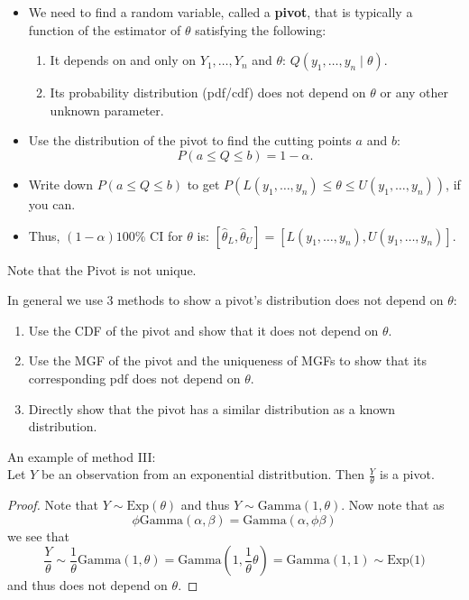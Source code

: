 \documentclass[a4paper,12pt]{article}
\theoremstyle{nonitalic}
\begin{document}
    \begin{itemize}
        \item We need to find a random variable, called a \textbf{pivot}, that is typically a function of the estimator of \(\theta\) satisfying the following:
        \begin{enumerate}
            \item It depends on and only on \(Y_1, \ldots, Y_n\) and \(\theta\): \(Q(y_1, \ldots, y_n \mid \theta)\).
            \item Its probability distribution (pdf/cdf) does not depend on \(\theta\) or any other unknown parameter.
        \end{enumerate}
        \item Use the distribution of the pivot to find the cutting points \(a\) and \(b\):
        \[
        P(a \leq Q \leq b) = 1 - \alpha.
        \]
        \item Write down \(P(a \leq Q \leq b)\) to get \(P(L(y_1, \ldots, y_n) \leq \theta \leq U(y_1, \ldots, y_n))\), if you can.
        \item Thus, \((1-\alpha)100\%\) CI for \(\theta\) is: \([\hat{\theta}_L, \hat{\theta}_U] = [L(y_1, \ldots, y_n), U(y_1, \ldots, y_n)]\).
    \end{itemize}

    Note that the Pivot is not unique.

    \bigskip

    In general we use 3 methods to show a pivot's distribution does not depend on $\theta$:
    \begin{enumerate}
        \item Use the CDF of the pivot and show that it does not depend on $\theta$.
        \item Use the MGF of the pivot and the uniqueness of MGFs to show that its corresponding pdf does not depend on $\theta$.
        \item Directly show that the pivot has a similar distribution as a known distribution.
    \end{enumerate}

    An example of method III:\\
    Let $Y$ be an observation from an exponential distritbution. Then $\frac{Y}{\theta}$ is a pivot.
    \begin{proof}
        Note that $Y \sim \text{Exp}(\theta)$ and thus $Y \sim \text{Gamma}(1, \theta)$. Now note that as
        \[
        \phi \text{Gamma}(\alpha, \beta) = \text{Gamma}(\alpha, \phi\beta)
        \]
        we see that
        \[
        \frac{Y}{\theta} \sim \frac{1}{\theta}\text{Gamma}(1,\theta) = \text{Gamma}(1,\frac{1}{\theta}\theta) = \text{Gamma}(1, 1) \sim \text{Exp(1)}
        \]
        and thus does not depend on $\theta$.
    \end{proof}
\end{document}

